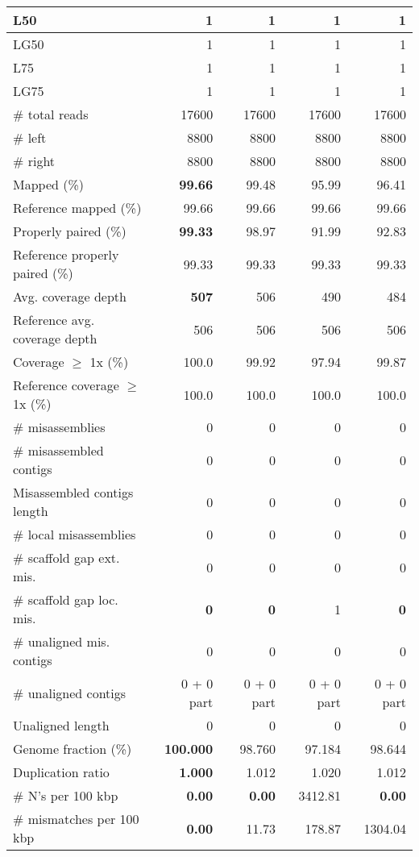 \documentclass[12pt,a4paper]{article}
\begin{document}
\begin{table}[ht]
\begin{center}
\begin{tabular}{|l*{4}{|r}|}
L50 & 1 & 1 & 1 & 1 \\ \hline
LG50 & 1 & 1 & 1 & 1 \\ \hline
L75 & 1 & 1 & 1 & 1 \\ \hline
LG75 & 1 & 1 & 1 & 1 \\ \hline
\# total reads & 17600 & 17600 & 17600 & 17600 \\ \hline
\# left & 8800 & 8800 & 8800 & 8800 \\ \hline
\# right & 8800 & 8800 & 8800 & 8800 \\ \hline
Mapped (\%) & {\bf 99.66} & 99.48 & 95.99 & 96.41 \\ \hline
Reference mapped (\%) & 99.66 & 99.66 & 99.66 & 99.66 \\ \hline
Properly paired (\%) & {\bf 99.33} & 98.97 & 91.99 & 92.83 \\ \hline
Reference properly paired (\%) & 99.33 & 99.33 & 99.33 & 99.33 \\ \hline
Avg. coverage depth & {\bf 507} & 506 & 490 & 484 \\ \hline
Reference avg. coverage depth & 506 & 506 & 506 & 506 \\ \hline
Coverage $\geq$ 1x (\%) & 100.0 & 99.92 & 97.94 & 99.87 \\ \hline
Reference coverage $\geq$ 1x (\%) & 100.0 & 100.0 & 100.0 & 100.0 \\ \hline
\# misassemblies & 0 & 0 & 0 & 0 \\ \hline
\# misassembled contigs & 0 & 0 & 0 & 0 \\ \hline
Misassembled contigs length & 0 & 0 & 0 & 0 \\ \hline
\# local misassemblies & 0 & 0 & 0 & 0 \\ \hline
\# scaffold gap ext. mis. & 0 & 0 & 0 & 0 \\ \hline
\# scaffold gap loc. mis. & {\bf 0} & {\bf 0} & 1 & {\bf 0} \\ \hline
\# unaligned mis. contigs & 0 & 0 & 0 & 0 \\ \hline
\# unaligned contigs & 0 + 0 part & 0 + 0 part & 0 + 0 part & 0 + 0 part \\ \hline
Unaligned length & 0 & 0 & 0 & 0 \\ \hline
Genome fraction (\%) & {\bf 100.000} & 98.760 & 97.184 & 98.644 \\ \hline
Duplication ratio & {\bf 1.000} & 1.012 & 1.020 & 1.012 \\ \hline
\# N's per 100 kbp & {\bf 0.00} & {\bf 0.00} & 3412.81 & {\bf 0.00} \\ \hline
\# mismatches per 100 kbp & {\bf 0.00} & 11.73 & 178.87 & 1304.04 \\ \hline

\end{tabular}
\end{center}
\end{table}
\end{document}
